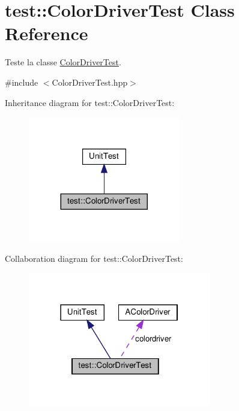 \hypertarget{classtest_1_1ColorDriverTest}{}\section{test\+:\+:Color\+Driver\+Test Class Reference}
\label{classtest_1_1ColorDriverTest}


Teste la classe \hyperlink{classtest_1_1ColorDriverTest}{Color\+Driver\+Test}.  




{\ttfamily \#include $<$Color\+Driver\+Test.\+hpp$>$}



Inheritance diagram for test\+:\+:Color\+Driver\+Test\+:
\nopagebreak
\begin{figure}[H]
\begin{center}
\leavevmode
\includegraphics[width=188pt]{classtest_1_1ColorDriverTest__inherit__graph}
\end{center}
\end{figure}


Collaboration diagram for test\+:\+:Color\+Driver\+Test\+:
\nopagebreak
\begin{figure}[H]
\begin{center}
\leavevmode
\includegraphics[width=226pt]{classtest_1_1ColorDriverTest__coll__graph}
\end{center}
\end{figure}
